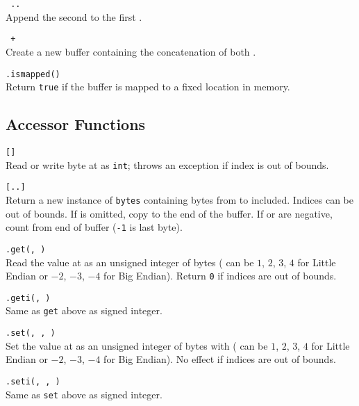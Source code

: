 \hangpar {}\texttt{ .. }\\
Append the second  to the first .

\hangpar {}\texttt{ + }\\
Create a new  buffer containing the concatenation of both .

\hangpar {}\texttt{.ismapped()}\\
Return \texttt{true} if the buffer is mapped to a fixed location in memory.

\subsection*{Accessor Functions}

\hangpar {}\texttt{[}\texttt{]} \\
Read or write byte at  as \texttt{int}; throws an exception if index is out of bounds.

\hangpar {}\texttt{[}\texttt{..}\texttt{]} \\
Return a new instance of \texttt{bytes} containing bytes from  to  included. Indices can be out of bounds. If  is omitted, copy to the end of the buffer. If  or  are negative, count from end of buffer (\texttt{-1} is last byte).

\hangpar {}\texttt{.get(}\texttt{, }\texttt{)} \\
Read the value at  as an unsigned integer of  bytes ( can be $1$, $2$, $3$, $4$ for Little Endian or $-2$, $-3$, $-4$ for Big Endian). Return \texttt{0} if indices are out of bounds.

\hangpar {}\texttt{.geti(}\texttt{, }\texttt{)} \\
Same as \texttt{get} above as signed integer.

\hangpar {}\texttt{.set(}\texttt{, }\texttt{, }\texttt{)} \\
Set the value at  as an unsigned integer of  bytes with  ( can be $1$, $2$, $3$, $4$ for Little Endian or $-2$, $-3$, $-4$ for Big Endian). No effect if indices are out of bounds.

\hangpar {}\texttt{.seti(}\texttt{, }\texttt{, }\texttt{)} \\
Same as \texttt{set} above as signed integer.

